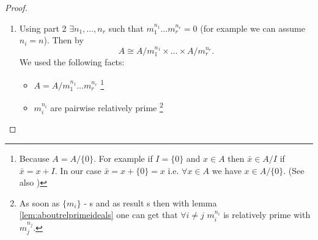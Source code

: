 \begin{theorem}
\begin{proof}
\begin{enumerate}
      $e_1, \dots, e_s$. And as soon as $J^n = J J^n$ we can write a
      vector $e_i \in J^n$ as a vector from $J^n$ multiplied on an
      object from $J$ i.e.
      \[
      e_i = \sum \lambda_{ij} e_j,
      \]
      there $e_j \in J^n, \lambda_{ij} \in J$. Thus if
      $M = Id - \lambda_{ij}$
      \[
      M \cdot \left(
      \begin{array}{c}
        e_1 \\
        \vdots \\
        e_s
      \end{array}
      \right) = 0.
      \]
      It's possible over ring to find a matrix $\tilde{M}$ such that
      \[
      \tilde{M} M = \det M \cdot Id,
      \]
      i.e.
      \[
      \det M \cdot \left(
      \begin{array}{c}
        e_1 \\
        \vdots \\
        e_s
      \end{array}
      \right) = 0.
      \]
      But $\det M = 1 + \lambda$ where $\lambda \in J$.
      \footnote{
        ??? Because the $\det$ is just a combination of different
        $\lambda_{ij} \in J$.
      }
      Since  $J = m_1 \cap \dots \cap m_r$ then
      $\forall i: \lambda \in m_i$
      so $\nexists i$ such that $1 + \lambda \in m_i$
      \footnote{
        ???
      }
      thus $1 + \lambda$ is invertable
      \footnote {
        ???
      }
      therefore $e_1 = \dots = e_s = 0$
      \footnote{
        Because $\det M = 1 + \lambda \ne 0$
      }
    \item Using part 2
      $\exists n_1, \dots, n_r$ such that
      $m_1^{n_1} \dots m_r^{n_r} = 0$ (for example we can assume
      $n_i = n$). Then by 
      \[
      A \cong
      A/{m_1^{n_1}} \times \dots \times A/{m_r^{n_r}}.
      \]
      We used the following facts:
      \begin{itemize}
      \item $A = A /m_1^{n_1} \dots m_r^{n_r}$
        \footnote{
          Because $A = A/\{0\}$. For example if $I = \{0\}$ and
          $x \in A$ then $\bar{x} \in A/I$ if $\bar{x} = x + I$. In
          our case $\bar{x} = x + \{0\} = x$ i.e. $\forall x \in A$ we
          have $x \in A/\{0\}$.
          (See also )
        }
      \item $m_i^{n_i}$ are pairwise relatively prime
        \footnote{
          As soon as $\{m_i\}$ - s and as result
          s then with lemma
          \ref{lem:aboutrelprimeideals} one can get that
          $\forall i \ne j$ $m_i^{n_i}$ is relatively prime with
          $m_j^{n_j}$.
        }
      \end{itemize}
    \end{enumerate}
  \end{proof}
  \label{thm:structurefinitekalgebra}
\end{theorem}

